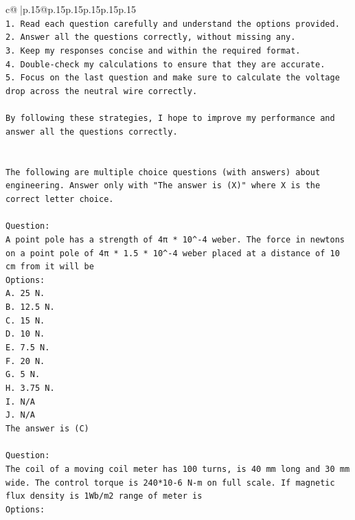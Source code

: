 \documentclass{article}
\begin{document}
{\begin{supertabular}{c@{$\;$}|p{.15\linewidth}@{}p{.15\linewidth}p{.15\linewidth}p{.15\linewidth}p{.15\linewidth}p{.15\linewidth}}
{{{\\ 
\texttt{1. Read each question carefully and understand the options provided.} \\
\texttt{2. Answer all the questions correctly, without missing any.} \\
\texttt{3. Keep my responses concise and within the required format.} \\
\texttt{4. Double{-}check my calculations to ensure that they are accurate.} \\
\texttt{5. Focus on the last question and make sure to calculate the voltage drop across the neutral wire correctly.} \\
\\ 
\texttt{By following these strategies, I hope to improve my performance and answer all the questions correctly.} \\
\\ 
\\ 
\texttt{The following are multiple choice questions (with answers) about engineering. Answer only with "The answer is (X)" where X is the correct letter choice.} \\
\\ 
\texttt{Question:} \\
\texttt{A point pole has a strength of 4π * 10\^{}{-}4 weber. The force in newtons on a point pole of 4π * 1.5 * 10\^{}{-}4 weber placed at a distance of 10 cm from it will be} \\
\texttt{Options:} \\
\texttt{A. 25 N.} \\
\texttt{B. 12.5 N.} \\
\texttt{C. 15 N.} \\
\texttt{D. 10 N.} \\
\texttt{E. 7.5 N.} \\
\texttt{F. 20 N.} \\
\texttt{G. 5 N.} \\
\texttt{H. 3.75 N.} \\
\texttt{I. N/A} \\
\texttt{J. N/A} \\
\texttt{The answer is (C)} \\
\\ 
\texttt{Question:} \\
\texttt{The coil of a moving coil meter has 100 turns, is 40 mm long and 30 mm wide. The control torque is 240*10{-}6 N{-}m on full scale. If magnetic flux density is 1Wb/m2 range of meter is} \\
\texttt{Options:} \\
}}}
\end{supertabular}}
\end{document}
